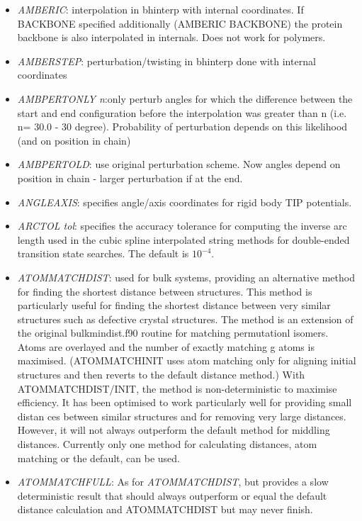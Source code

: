 \documentclass[12pt,a4paper,dvips]{article}
\begin{document}
\begin{itemize}
\item{\it AMBERIC}: interpolation in bhinterp with internal coordinates. If BACKBONE specified additionally (AMBERIC BACKBONE) the protein backbone is also interpolated in internals. Does not work for polymers.

\item{\it AMBERSTEP}: perturbation/twisting in bhinterp done with internal coordinates

\item{\it AMBPERTONLY n}:only perturb angles for which the difference between the start and end configuration before the interpolation was greater than n (i.e. n= 30.0 - 30 degree). Probability of perturbation depends on this likelihood (and on position in chain)

\item{\it AMBPERTOLD}: use original perturbation scheme. Now angles depend on position in chain - larger perturbation if at the end.

\item {\it ANGLEAXIS}: specifies angle/axis coordinates for rigid body TIP potentials.

\item {\it ARCTOL tol\/}: specifies the accuracy tolerance for computing the
  inverse arc length used in the cubic spline interpolated string methods for
  double-ended transition state searches. The default is $10^{-4}$.

\item {\it ATOMMATCHDIST}: used for bulk systems, providing an alternative method for finding the shortest distance between structures.
This method is particularly useful for finding the shortest distance between very similar structures such as defective crystal structures.
The method is an extension of the original bulkmindist.f90 routine for matching permutationl isomers. Atoms are overlayed and the number of exactly matching
g atoms is maximised. (ATOMMATCHINIT uses atom matching only for aligning initial structures and then reverts to the default distance method.)
With ATOMMATCHDIST/INIT, the method is non-deterministic to maximise efficiency. It has been optimised to work particularly well for providing small distan
ces between similar structures and for removing very large distances. However, it will not always outperform the default method for middling distances.    
Currently only one method for calculating distances, atom matching or the default, can be used.  

\item {\it ATOMMATCHFULL}: As for {\it ATOMMATCHDIST}, but provides a slow deterministic result that should always outperform or equal the default distance calculation and ATOMMATCHDIST but may never finish.


\end{itemize}
\end{document}
